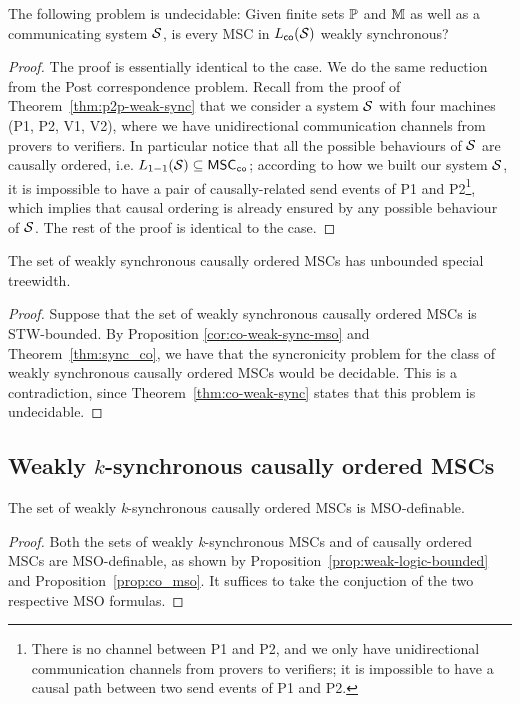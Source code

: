 \begin{theorem}\label{thm:co-weak-sync}
The following problem is undecidable:
Given finite sets $\mathbb{P}$ and $\mathbb{M}$ as well as a communicating system $\mathcal{S}$,
is every MSC in $L_{\mathsf{co}}(\mathcal{S})$ weakly synchronous?
\end{theorem}
\begin{proof}
The proof is essentially identical to the \pp case. We do the same reduction from the Post correspondence problem. Recall from the proof of Theorem~\ref{thm:p2p-weak-sync} that we consider a system $\mathcal{S}$ with four machines (P1, P2, V1, V2), where we have unidirectional communication channels from provers to verifiers. In particular notice that all the possible behaviours of $\mathcal{S}$ are causally ordered, i.e. $L_{1\mathsf{-}1}(\mathcal{S}) \subseteq \mathsf{MSC}_{\mathtt{co}}$; according to how we built our system $\mathcal{S}$, it is impossible to have a pair of causally-related send events of P1 and P2\footnote{There is no channel between P1 and P2, and we only have unidirectional communication channels from provers to verifiers; it is impossible to have a causal path between two send events of P1 and P2.}, which implies that causal ordering is already ensured by any possible \pp behaviour of $\mathcal{S}$. The rest of the proof is identical to the \pp case.
\end{proof}

\begin{corollary}
The set of weakly synchronous causally ordered MSCs has unbounded special treewidth.
\end{corollary}
\begin{proof}
Suppose that the set of weakly synchronous causally ordered MSCs is STW-bounded. By Proposition \ref{cor:co-weak-sync-mso} and Theorem~\ref{thm:sync_co}, we have that the syncronicity problem for the class of weakly synchronous causally ordered MSCs would be decidable. This is a contradiction, since Theorem~\ref{thm:co-weak-sync} states that this problem is undecidable.
\end{proof}

\subsection{Weakly \texorpdfstring{$k$}{k}-synchronous causally ordered MSCs} 

\begin{proposition}\label{prop:co-weak-k-sync-mso}
The set of weakly \emph{k}-synchronous causally ordered MSCs is MSO-definable.
\end{proposition}
\begin{proof}
Both the sets of weakly \emph{k}-synchronous MSCs and of causally ordered MSCs are MSO-definable, as shown by Proposition~\ref{prop:weak-logic-bounded} and Proposition~\ref{prop:co_mso}. It suffices to take the conjuction of the two respective MSO formulas.
\end{proof}

